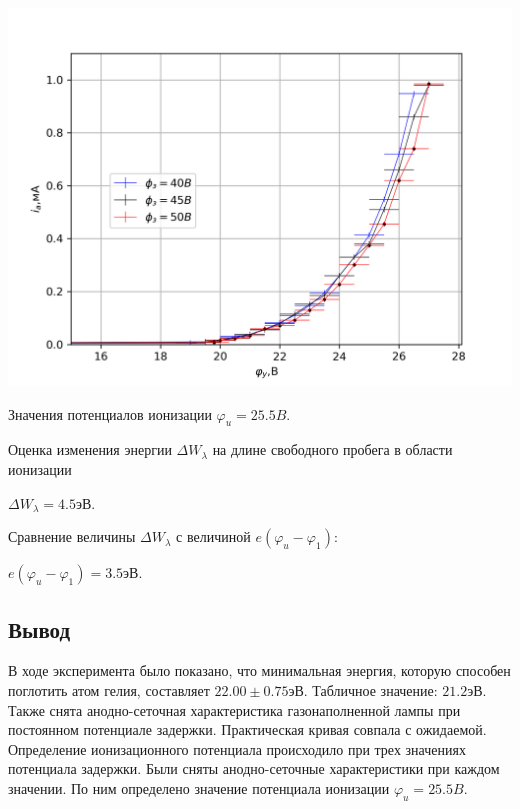 \begin{minipage}{\linewidth}
        \includegraphics[width=\linewidth]{22.png} 
\end{minipage}


Значения потенциалов ионизации $\varphi_{u}=25.5B$.


Оценка изменения энергии $\Delta W_{\lambda}$ на длине свободного пробега в области ионизации

$\Delta W_{\lambda}=4.5 \text{эВ}$.

Сравнение величины $\Delta W_{\lambda}$ с величиной $e(\varphi_{u}-\varphi_{1})$: 

$e(\varphi_{u}-\varphi_{1})=3.5\text{эВ}$.

\subsection{Вывод}
В ходе эксперимента было показано, что минимальная энергия, которую способен поглотить атом гелия, составляет $22.00\pm{0.75} \text{эВ}$. Табличное значение: $21.2\text{эВ}$. Также снята анодно-сеточная характеристика газонаполненной лампы при постоянном потенциале задержки. Практическая кривая совпала с ожидаемой. Определение ионизационного потенциала происходило при трех значениях потенциала задержки. Были сняты анодно-сеточные характеристики при каждом значении. По ним определено значение потенциала ионизации $\varphi_{u}=25.5B$.
